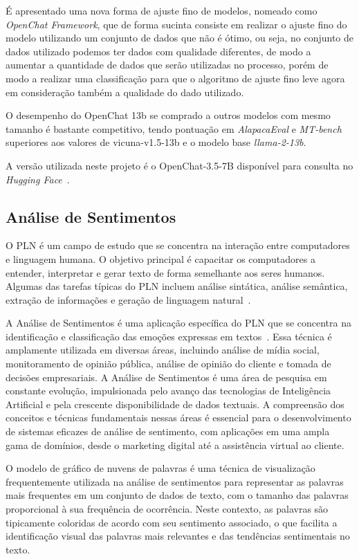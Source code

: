 É apresentado uma nova forma de ajuste fino de modelos, nomeado como \textit{OpenChat Framework}, que de forma sucinta consiste em realizar o ajuste fino do modelo utilizando um conjunto de dados que não é ótimo, ou seja, no conjunto de dados utilizado podemos ter dados com qualidade diferentes, de modo a aumentar a quantidade de dados que serão utilizadas no processo, porém de modo a realizar uma classificação para que o algoritmo de ajuste fino leve agora em consideração também a qualidade do dado utilizado.

O desempenho do OpenChat 13b se comprado a outros modelos com mesmo tamanho é bastante competitivo, tendo pontuação em \textit{AlapacaEval} e \textit{MT-bench} superiores aos valores de vicuna-v1.5-13b e o modelo base \textit{llama-2-13b}.

A versão utilizada neste projeto é o OpenChat-3.5-7B disponível para consulta no \textit{Hugging Face}~\cite{openChat357b}.

\subsection{Análise de Sentimentos}
\label{cap:fund_teorica:sec:analise_sentimento}

O PLN é um campo de estudo que se concentra na interação entre computadores e linguagem humana. O objetivo principal é capacitar os computadores a entender, interpretar e gerar texto de forma semelhante aos seres humanos. Algumas das tarefas típicas do PLN incluem análise sintática, análise semântica, extração de informações e geração de linguagem natural~\cite{anchieta2021pln}.

A Análise de Sentimentos é uma aplicação específica do PLN que se concentra na identificação e classificação das emoções expressas em textos~\cite{Liu2012}. Essa técnica é amplamente utilizada em diversas áreas, incluindo análise de mídia social, monitoramento de opinião pública, análise de opinião do cliente e tomada de decisões empresariais. A Análise de Sentimentos é uma área de pesquisa em constante evolução, impulsionada pelo avanço das tecnologias de Inteligência Artificial e pela crescente disponibilidade de dados textuais. A compreensão dos conceitos e técnicas fundamentais nessas áreas é essencial para o desenvolvimento de sistemas eficazes de análise de sentimento, com aplicações em uma ampla gama de domínios, desde o marketing digital até a assistência virtual ao cliente.

O modelo de gráfico de nuvens de palavras é uma técnica de visualização frequentemente utilizada na análise de sentimentos para representar as palavras mais frequentes em um conjunto de dados de texto, com o tamanho das palavras proporcional à sua frequência de ocorrência. Neste contexto, as palavras são tipicamente coloridas de acordo com seu sentimento associado, o que facilita a identificação visual das palavras mais relevantes e das tendências sentimentais no texto.

